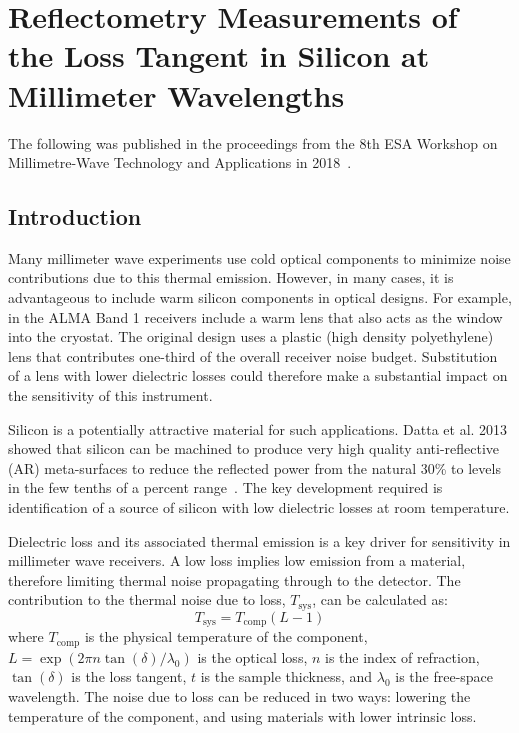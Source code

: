 \chapter{Reflectometry Measurements of the Loss Tangent in Silicon at Millimeter Wavelengths}
\label{ch:si}
The following was published in the proceedings from the 8th ESA Workshop on Millimetre-Wave Technology and Applications in 2018~\cite{ches18}.
\section{Introduction}
Many millimeter wave experiments use cold optical components to minimize noise contributions due to this thermal emission. However, in many cases, it is advantageous to include warm silicon components in optical designs. For example, in the ALMA Band 1 receivers include a warm lens that also acts as the window into the cryostat. The original design uses a plastic (high density polyethylene) lens that contributes one-third of the overall receiver noise budget. Substitution of a lens with lower dielectric losses could therefore make a substantial impact on the sensitivity of this instrument.

Silicon is a potentially attractive material for such applications. Datta et al. 2013 showed that silicon can be machined to produce very high quality anti-reflective (AR) meta-surfaces to reduce the reflected power from the natural 30\% to levels in the few tenths of a percent range~\cite{Datta:13}. The key development required is identification of a source of silicon with low dielectric losses at room temperature.

Dielectric loss and its associated thermal emission is a key driver for sensitivity in millimeter wave receivers. A low loss implies low emission from a material, therefore limiting thermal noise propagating through to the detector. The
contribution to the thermal noise due to loss,  $T_{\text{sys}}$, can be calculated as:
\begin{equation}
    T_{\text{sys}}=T_{\text{comp}}(L-1)
\end{equation}
where $T_{\text{comp}}$ is the physical temperature of the component, $L=\exp(2\pi n \tan(\delta)/\lambda_0)$ is the optical loss, $n$ is the index of refraction, $\tan(\delta)$ is the loss tangent, $t$ is the sample thickness, and $\lambda_0$ is the free-space wavelength. The noise due to loss can be reduced in two ways: lowering the temperature of the component, and using materials with lower intrinsic loss. 

